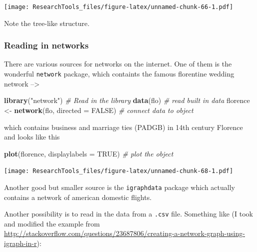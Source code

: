 \documentclass[]{article}
\newenvironment{Shaded}{\begin{snugshade}}{\end{snugshade}}
\newcommand{\KeywordTok}[1]{\textcolor[rgb]{0.13,0.29,0.53}{\textbf{#1}}}
\newcommand{\DataTypeTok}[1]{\textcolor[rgb]{0.13,0.29,0.53}{#1}}
\newcommand{\StringTok}[1]{\textcolor[rgb]{0.31,0.60,0.02}{#1}}
\newcommand{\CommentTok}[1]{\textcolor[rgb]{0.56,0.35,0.01}{\textit{#1}}}
\newcommand{\OtherTok}[1]{\textcolor[rgb]{0.56,0.35,0.01}{#1}}
\newcommand{\NormalTok}[1]{#1}
\theoremstyle{definition}
\theoremstyle{definition}
\theoremstyle{definition}
\theoremstyle{remark}
\begin{document}
\texttt{[image: ResearchTools\_files/figure-latex/unnamed-chunk-66-1.pdf]}

Note the tree-like structure.

\subsubsection{Reading in networks}\label{reading-in-networks}

There are various sources for networks on the internet. One of them is
the wonderful \texttt{network} package, which containts the famous
florentine wedding network --\textgreater{}

\begin{Shaded}
\begin{Highlighting}[]
\KeywordTok{library}\NormalTok{(}\StringTok{"network"}\NormalTok{)                 }\CommentTok{# Read in the library}
\KeywordTok{data}\NormalTok{(flo)                          }\CommentTok{# read built in data}
\NormalTok{florence <-}\StringTok{ }\KeywordTok{network}\NormalTok{(flo, }\DataTypeTok{directed =} \OtherTok{FALSE}\NormalTok{) }\CommentTok{# connect data to object}
\end{Highlighting}
\end{Shaded}

which contains business and marriage ties (PADGB) in 14th century
Florence and looks like this

\begin{Shaded}
\begin{Highlighting}[]
\KeywordTok{plot}\NormalTok{(florence, }\DataTypeTok{displaylabels =} \OtherTok{TRUE}\NormalTok{) }\CommentTok{# plot the object}
\end{Highlighting}
\end{Shaded}

\texttt{[image: ResearchTools\_files/figure-latex/unnamed-chunk-68-1.pdf]}

Another good but smaller source is the \texttt{igraphdata} package which
actually contains a network of american domestic flights.

Another possibility is to read in the data from a \texttt{.csv} file.
Something like (I took and modified the example from
\url{http://stackoverflow.com/questions/23687806/creating-a-network-graph-using-igraph-in-r}):
\end{document}
